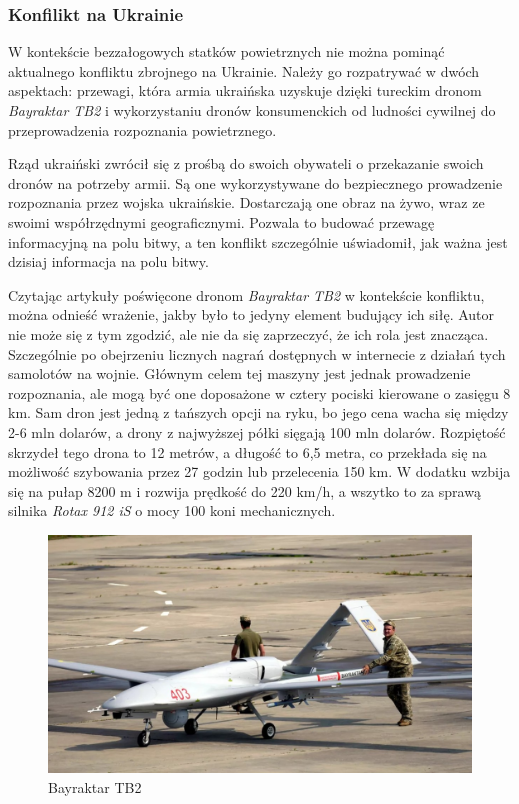 \subsubsection{Konfilikt na Ukrainie}
W kontekście bezzałogowych statków powietrznych nie można pominąć aktualnego konfliktu zbrojnego na Ukrainie. Należy go rozpatrywać w dwóch aspektach: przewagi, która armia ukraińska uzyskuje dzięki tureckim dronom \textit{Bayraktar TB2} i wykorzystaniu dronów konsumenckich od ludności cywilnej do przeprowadzenia rozpoznania powietrznego.

Rząd ukraiński zwrócił się z prośbą do swoich obywateli o przekazanie swoich dronów na potrzeby armii. Są one wykorzystywane do bezpiecznego prowadzenie rozpoznania przez wojska ukraińskie. Dostarczają one obraz na żywo, wraz ze swoimi współrzędnymi geograficznymi. Pozwala to budować przewagę informacyjną na polu bitwy, a ten konflikt szczególnie uświadomił, jak ważna jest dzisiaj informacja na polu bitwy.\cite{fotografia-drony-ukraina}

Czytając artykuły poświęcone dronom \textit{Bayraktar TB2} w kontekście konfliktu, można odnieść wrażenie, jakby było to jedyny element budujący ich siłę. Autor nie może się z tym zgodzić, ale nie da się zaprzeczyć, że ich rola jest znacząca. Szczególnie po obejrzeniu licznych nagrań dostępnych w internecie z działań tych samolotów na wojnie. Głównym celem tej maszyny jest jednak prowadzenie rozpoznania, ale mogą być one doposażone w cztery pociski kierowane o zasięgu 8 km. Sam dron jest jedną z tańszych opcji na ryku, bo jego cena wacha się między 2-6 mln dolarów, a drony z najwyższej półki sięgają 100 mln dolarów. Rozpiętość skrzydeł tego drona to 12 metrów, a długość to 6,5 metra, co przekłada się na możliwość szybowania przez 27 godzin lub przelecenia 150 km. W dodatku wzbija się na pułap 8200 m i rozwija prędkość do 220 km/h, a wszytko to za sprawą silnika \textit{Rotax 912 iS} o mocy 100 koni mechanicznych.\cite{bayraktar-chip}\cite{bayraktar-pap}

\begin{figure}[!ht]
  \centering
  \includegraphics[width=12cm]{./Obrazy/Bayraktar_TB2_ukraina.jpg}
  \caption{Bayraktar TB2}
  \end{figure}


